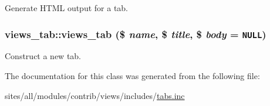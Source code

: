 Generate HTML output for a tab. \hypertarget{classviews__tab_2fa4945f021094785ab172024ac6ed33}{
\subsubsection[{views\_\-tab}]{\setlength{\rightskip}{0pt plus 5cm}views\_\-tab::views\_\-tab (\$ {\em name}, \/  \$ {\em title}, \/  \$ {\em body} = {\tt NULL})}}
\label{classviews__tab_2fa4945f021094785ab172024ac6ed33}


Construct a new tab. 

The documentation for this class was generated from the following file:\begin{CompactItemize}
\item 
sites/all/modules/contrib/views/includes/\hyperlink{tabs_8inc}{tabs.inc}\end{CompactItemize}
